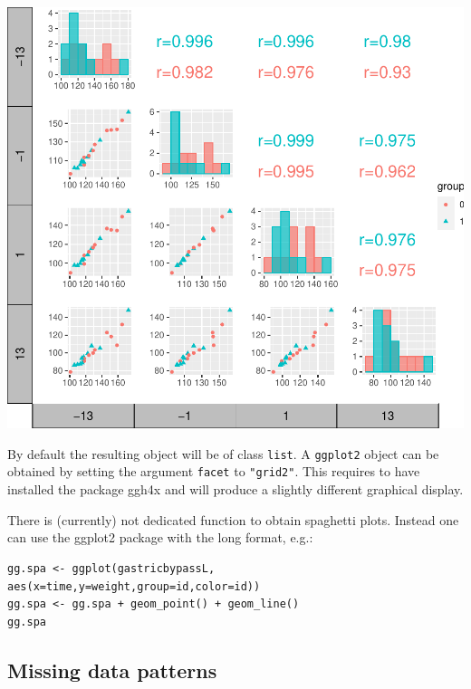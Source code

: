 \documentclass[12pt]{article}
\begin{document}
\begin{minipage}{0.48\linewidth}
\begin{center}
\includegraphics[trim={0 0 0 0},width=\textwidth]{./figures/scatterplot-group.pdf}
\end{center}
\end{minipage}


\bigskip

By default the resulting object will be of class \texttt{list}. A \texttt{ggplot2}
object can be obtained by setting the argument \texttt{facet} to
\texttt{"grid2"}. This requires to have installed the package ggh4x and will
produce a slightly different graphical display.

\bigskip

There is (currently) not dedicated function to obtain spaghetti
plots. Instead one can use the ggplot2 package with the long format, e.g.:
\lstset{language=r,label= ,caption= ,captionpos=b,numbers=none}
\begin{lstlisting}
gg.spa <- ggplot(gastricbypassL, aes(x=time,y=weight,group=id,color=id))
gg.spa <- gg.spa + geom_point() + geom_line()
gg.spa
\end{lstlisting}

\clearpage

\subsection{Missing data patterns}
\label{sec:org4b87c71}
\end{document}
